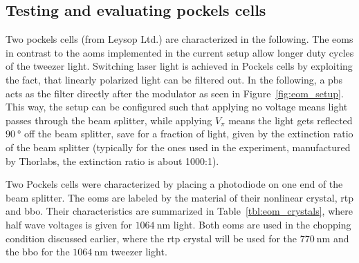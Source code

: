 \subsection{Testing and evaluating pockels cells}

Two pockels cells (from Leysop Ltd.) are characterized in the following. The \acp{eom} in contrast to the \acp{aom} implemented in the current setup allow longer duty cycles of the tweezer light. Switching laser light is achieved in Pockels cells by exploiting the fact, that linearly polarized light can be filtered out. In the following, a \ac{pbs} acts as the filter directly after the modulator as seen in Figure~\ref{fig:eom_setup}. This way, the setup can be configured such that applying no voltage means light passes through the beam splitter, while applying $V_\pi$ means the light gets reflected $\SI{90}{\degree}$ off the beam splitter, save for a fraction of light, given by the extinction ratio of the beam splitter (typically for the ones used in the experiment, manufactured by Thorlabs, the extinction ratio is about 1000:1).

\begin{figure}[t]%
\end{figure}

Two  Pockels cells were characterized by placing a photodiode on one end of the beam splitter. The \acp{eom} are labeled by the material of their nonlinear crystal, \ac{rtp} and \ac{bbo}. Their characteristics are summarized in Table~\ref{tbl:eom_crystals}, where half wave voltages is given for $\SI{1064}{\nano\meter}$ light. Both \acp{eom} are used in the chopping condition discussed earlier, where the \ac{rtp} crystal will be used for the $\SI{770}{\nano\meter}$ and the \ac{bbo} for the $\SI{1064}{\nano\meter}$ tweezer light.

